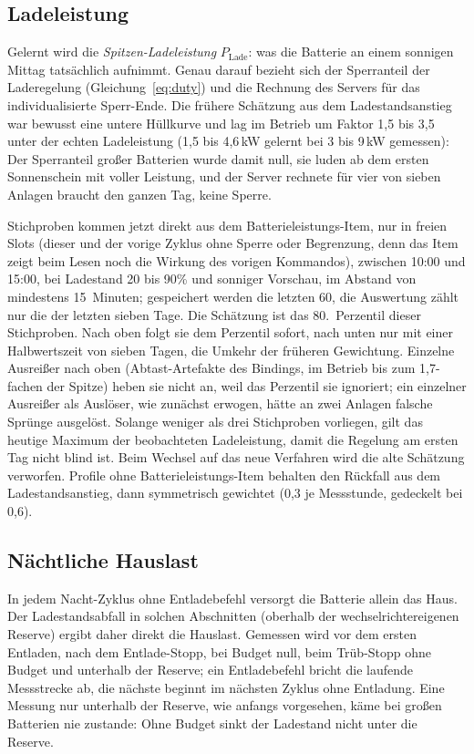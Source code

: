 \documentclass[11pt,a4paper]{article}
\begin{document}
\subsection{Ladeleistung}

Gelernt wird die \emph{Spitzen-Ladeleistung} $P_{\text{Lade}}$: was die
Batterie an einem sonnigen Mittag tatsächlich aufnimmt. Genau darauf bezieht
sich der Sperranteil der Laderegelung (Gleichung~\eqref{eq:duty}) und die
Rechnung des Servers für das individualisierte Sperr-Ende. Die frühere
Schätzung aus dem Ladestandsanstieg war bewusst eine untere Hüllkurve und
lag im Betrieb um Faktor 1,5 bis 3,5 unter der echten Ladeleistung
(1,5 bis 4,6\,kW gelernt bei 3 bis 9\,kW gemessen): Der Sperranteil großer
Batterien wurde damit null, sie luden ab dem ersten Sonnenschein mit voller
Leistung, und der Server rechnete für vier von sieben Anlagen \glqq braucht
den ganzen Tag, keine Sperre\grqq.

Stichproben kommen jetzt direkt aus dem Batterieleistungs-Item, nur in
freien Slots (dieser und der vorige Zyklus ohne Sperre oder Begrenzung,
denn das Item zeigt beim Lesen noch die Wirkung des vorigen Kommandos),
zwischen 10:00 und 15:00, bei Ladestand 20 bis 90\% und sonniger Vorschau,
im Abstand von mindestens 15~Minuten; gespeichert werden die letzten 60, die
Auswertung zählt nur die der letzten sieben Tage. Die Schätzung ist das
80.~Perzentil dieser Stichproben. Nach oben folgt sie dem Perzentil sofort,
nach unten nur mit einer Halbwertszeit von sieben Tagen, die Umkehr der
früheren Gewichtung. Einzelne Ausreißer nach oben (Abtast-Artefakte des
Bindings, im Betrieb bis zum 1,7-fachen der Spitze) heben sie nicht an, weil
das Perzentil sie ignoriert; ein einzelner Ausreißer als Auslöser, wie
zunächst erwogen, hätte an zwei Anlagen falsche Sprünge ausgelöst. Solange
weniger als drei Stichproben vorliegen, gilt das heutige Maximum der
beobachteten Ladeleistung, damit die Regelung am ersten Tag nicht blind ist.
Beim Wechsel auf das neue Verfahren wird die alte Schätzung verworfen.
Profile ohne Batterieleistungs-Item behalten den Rückfall aus dem
Ladestandsanstieg, dann symmetrisch gewichtet (0,3 je Messstunde,
gedeckelt bei 0,6).

\subsection{Nächtliche Hauslast}\label{sec:hauslast}

In jedem Nacht-Zyklus ohne Entladebefehl versorgt die Batterie allein das
Haus. Der Ladestandsabfall in solchen Abschnitten (oberhalb der
wechselrichtereigenen Reserve) ergibt daher direkt die Hauslast. Gemessen
wird vor dem ersten Entladen, nach dem Entlade-Stopp, bei Budget null, beim
Trüb-Stopp ohne Budget und unterhalb der Reserve; ein Entladebefehl bricht
die laufende Messstrecke ab, die nächste beginnt im nächsten Zyklus ohne
Entladung. Eine Messung nur unterhalb der Reserve, wie anfangs vorgesehen,
käme bei großen Batterien nie zustande: Ohne Budget sinkt der Ladestand
nicht unter die Reserve.
\end{document}
